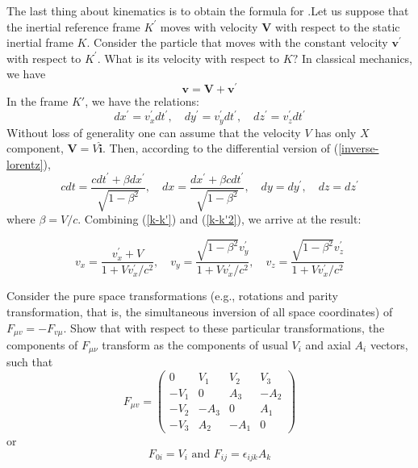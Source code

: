 The last thing about kinematics is to obtain the formula for \textbf{}.Let us suppose that the inertial reference frame $K^{\prime}$ moves with velocity $\mathbf{V}$ with respect to the static inertial frame $K .$ Consider the particle that moves with the constant velocity $\mathbf{v}^{\prime}$ with respect to $K^{\prime} .$ What is its velocity with respect to $K ?$ In classical mechanics, we have
$$
\mathbf{v}=\mathbf{V}+\mathbf{v}^{\prime}
$$
In the frame $K'$, we have the relations:
\begin{equation}
    d x^{\prime}=v_{x}^{\prime} d t^{\prime}, \quad d y^{\prime}=v_{y}^{\prime} d t^{\prime}, \quad d z^{\prime}=v_{z}^{\prime} d t^{\prime}
    \label{k-k'}
\end{equation}
Without loss of generality one can assume that the velocity $V$ has only $X$ component, $\mathbf{V}=V \hat{\mathbf{i}} .$ Then, according to the differential version of (\ref{inverse-lorentz}),
\begin{equation}
    c d t=\frac{c d t^{\prime}+\beta d x^{\prime}}{\sqrt{1-\beta^{2}}}, \quad d x=\frac{d x^{\prime}+\beta c d t^{\prime}}{\sqrt{1-\beta^{2}}}, \quad d y=d y^{\prime}, \quad d z=d z^{\prime}
    \label{k-k'2}
\end{equation}
where $\beta=V/c$. Combining (\ref{k-k'}) and (\ref{k-k'2}), we arrive at the result:
\begin{qt}
    \begin{equation}
v_{x}=\frac{v_{x}^{\prime}+V}{1+V v_{x}^{\prime} / c^{2}}, \quad v_{y}=\frac{\sqrt{1-\beta^{2}} v_{y}^{\prime}}{1+V v_{x}^{\prime} / c^{2}}, \quad v_{z}=\frac{\sqrt{1-\beta^{2}} v_{z}^{\prime}}{1+V v_{x}^{\prime} / c^{2}}
\end{equation}
\end{qt}
\begin{example}
 Consider the pure space transformations (e.g., rotations and parity transformation, that is, the simultaneous inversion of all space coordinates) of $F_{\mu v}=-F_{v \mu} .$ Show that with respect to these particular transformations, the components of $F_{\mu\nu}$ transform as the components of usual $V_i$ and axial $A_i$ vectors, such that
 \begin{equation}
F_{\mu v}=\left(\begin{array}{cccc}
{0} & {V_{1}} & {V_{2}} & {V_{3}} \\
{-V_{1}} & {0} & {A_{3}} & {-A_{2}} \\
{-V_{2}}&{-A_{3}} & {0} & {A_{1}} \\
{-V_{3}} & {A_{2}} & {-A_{1}} & {0}
\end{array}\right)
\end{equation}
or 
\begin{equation}
 F_{0 i}=V_{i} \text { and } F_{i j}=\epsilon_{i j k} A_{k}
\end{equation}
\end{example}
